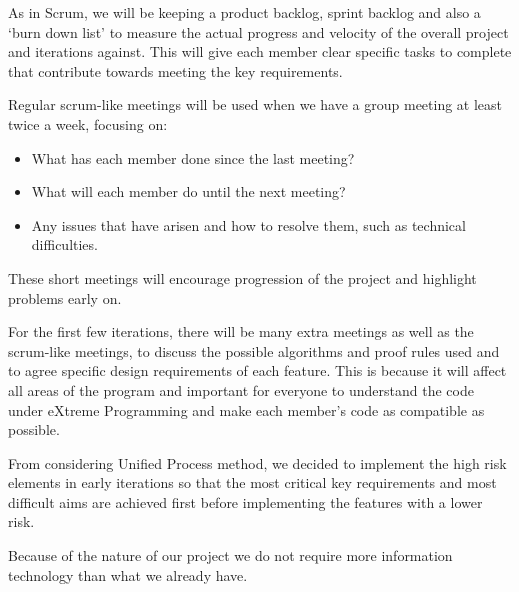 As in Scrum, we will be keeping a product backlog, sprint backlog and also a `burn down list' to measure the actual progress and velocity of the overall project and iterations against. This will give each member clear specific tasks to complete that contribute towards meeting the key requirements.

Regular scrum-like meetings will be used when we have a group meeting at least twice a week, focusing on:

\begin{itemize}
\item What has each member done since the last meeting?
\item What will each member do until the next meeting?
\item Any issues that have arisen and how to resolve them, such as technical difficulties.
\end{itemize}

These short meetings will encourage progression of the project and highlight problems early on.

For the first few iterations, there will be many extra meetings as well as the scrum-like meetings, to discuss the possible algorithms and proof rules used and to agree specific design requirements of each feature. This is because it will affect all areas of the program and important for everyone to understand the code under eXtreme Programming and make each member's code as compatible as possible.

From considering Unified Process method, we decided to implement the high risk elements in early iterations so that the most critical key requirements and most difficult aims are achieved first before implementing the features with a lower risk.

Because of the nature of our project we do not require more information technology than what we already have.
